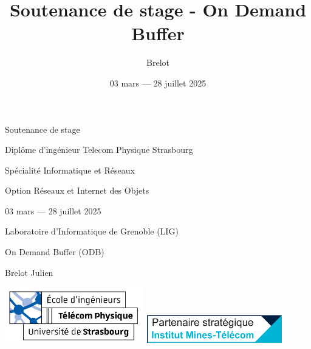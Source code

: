 \documentclass[aspectratio=43,8pt]{beamer}
\title{Soutenance de stage - On Demand Buffer}
\author[Brelot]{Brelot}
\date{ 03 mars — 28 juillet 2025}
\begin{document}

\begin{frame}[plain]
    \centering
    {\Huge Soutenance de stage\par}
    {\huge Diplôme d’ingénieur Telecom Physique Strasbourg\par}
    {\Large Spécialité Informatique et Réseaux\par}
    {\Large Option Réseaux et Internet des Objets\par}
    \vspace{0.5cm}
    {\large 03 mars — 28 juillet 2025 \par}
    {\large Laboratoire d’Informatique de Grenoble (LIG)\par}
    {\large On Demand Buffer (ODB)\par}
    \vspace{1cm}
    {\Large Brelot Julien\par}
    \vspace{1cm}
        \centering
        \includegraphics[width=0.45\textwidth]{img2/logo-tps.png}
        \includegraphics[width=0.45\textwidth]{img2/imt.png}
\end{frame}
\end{document}
